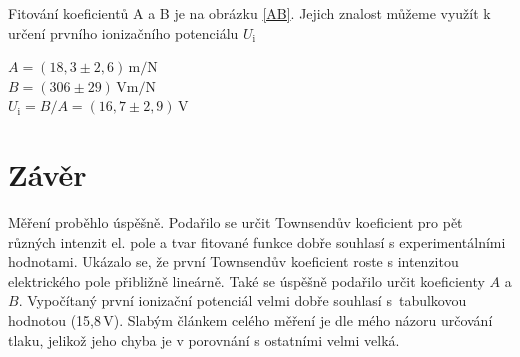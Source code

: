 \documentclass[12pt]{article}
\begin{document}
Fitování koeficientů A a B je na obrázku \ref{AB}. Jejich znalost můžeme využít k určení prvního ionizačního potenciálu $U_\mathrm{i}$\\
\begin{center}
$A = (18,3 \pm 2,6)\,\mathrm{m/N}$\\
$B = (306 \pm 29)\,\mathrm{Vm/N}$\\
$U_\mathrm{i} = B/A = (16,7 \pm 2,9)\,\mathrm{V}$
\end{center}


\section{Závěr}
Měření proběhlo úspěšně. Podařilo se určit Townsendův koeficient pro pět různých intenzit el. pole a tvar fitované funkce dobře souhlasí s experimentálními hodnotami. Ukázalo se, že první Townsendův koeficient roste s intenzitou elektrického pole přibližně lineárně. Také se úspěšně podařilo určit koeficienty $A$ a $B$. Vypočítaný první ionizační potenciál velmi dobře souhlasí s~tabulkovou hodnotou (15,8\,V). Slabým článkem celého měření je dle mého názoru určování tlaku, jelikož jeho chyba je v porovnání s ostatními velmi velká.
\end{document}

